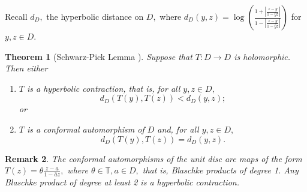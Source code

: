 \documentclass[12pt,reqno]{amsart}
\newtheorem{theorem}{Theorem}
\numberwithin{theorem}{section}
\newtheorem{remark}[theorem]{Remark}%
\begin{document}
Recall $d_{D},$ the hyperbolic distance on $D,$ where $d_{D}(y,z)=\log\left(\frac{1+\left|\frac{z-y}{1-\bar{y}z}\right|}{1-\left|\frac{z-y}{1-\bar{y}z}\right|}\right)$ for $y,z\in D.$
\begin{theorem}[Schwarz-Pick Lemma \cite{hyperbolic_metric}]\label{scwarz_pick}
    Suppose that $T:D\to D$ is holomorphic.  Then either
    \begin{enumerate}
        \item $T$ is a hyperbolic contraction, that is, for all $y,z\in D,$ $$d_{D}(T(y),T(z))<d_{D}(y,z);$$ or
        \item $T$ is a conformal automorphism of $D$ and, for all $y,z\in D,$ $$d_{D}(T(y),T(z))=d_{D}(y,z).$$
    \end{enumerate}
\end{theorem}
\begin{remark}
    The conformal automorphisms of the unit disc are maps of the form $T(z)=\theta\frac{z-a}{1-\bar{a}z},$ where $\theta\in\mathbb{T}, a\in D,$ that is, Blaschke products of degree 1. Any Blaschke product of degree at least 2 is a hyperbolic contraction.
\end{remark}
\end{document}
